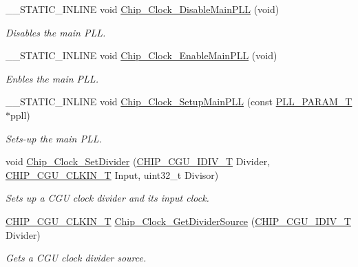 \begin{DoxyCompactItemize}
\+\_\+\+\_\+\+S\+T\+A\+T\+I\+C\+\_\+\+I\+N\+L\+I\+NE void \hyperlink{group___c_l_o_c_k__18_x_x__43_x_x_ga752e7a9c291cb61877d9f00a2c9772a3}{Chip\+\_\+\+Clock\+\_\+\+Disable\+Main\+P\+LL} (void)
\begin{DoxyCompactList}\small\item\em Disables the main P\+LL. \end{DoxyCompactList}\item 
\+\_\+\+\_\+\+S\+T\+A\+T\+I\+C\+\_\+\+I\+N\+L\+I\+NE void \hyperlink{group___c_l_o_c_k__18_x_x__43_x_x_gaf6a067bb264ab963d7f81eaa24ce9ec0}{Chip\+\_\+\+Clock\+\_\+\+Enable\+Main\+P\+LL} (void)
\begin{DoxyCompactList}\small\item\em Enbles the main P\+LL. \end{DoxyCompactList}\item 
\+\_\+\+\_\+\+S\+T\+A\+T\+I\+C\+\_\+\+I\+N\+L\+I\+NE void \hyperlink{group___c_l_o_c_k__18_x_x__43_x_x_ga227521c8f7cb4a3f3cff4b9b8c5364f0}{Chip\+\_\+\+Clock\+\_\+\+Setup\+Main\+P\+LL} (const \hyperlink{struct_p_l_l___p_a_r_a_m___t}{P\+L\+L\+\_\+\+P\+A\+R\+A\+M\+\_\+T} $\ast$ppll)
\begin{DoxyCompactList}\small\item\em Sets-\/up the main P\+LL. \end{DoxyCompactList}\item 
void \hyperlink{group___c_l_o_c_k__18_x_x__43_x_x_ga9df837b459e11fdf1eda8d48be292fc5}{Chip\+\_\+\+Clock\+\_\+\+Set\+Divider} (\hyperlink{chip__clocks_8h_a588e8716294cc2deec5d583add455521}{C\+H\+I\+P\+\_\+\+C\+G\+U\+\_\+\+I\+D\+I\+V\+\_\+T} Divider, \hyperlink{group___c_l_o_c_k__18_x_x__43_x_x_ga0975326707efebf2b074283e6c602f18}{C\+H\+I\+P\+\_\+\+C\+G\+U\+\_\+\+C\+L\+K\+I\+N\+\_\+T} Input, uint32\+\_\+t Divisor)
\begin{DoxyCompactList}\small\item\em Sets up a C\+GU clock divider and it\textquotesingle{}s input clock. \end{DoxyCompactList}\item 
\hyperlink{group___c_l_o_c_k__18_x_x__43_x_x_ga0975326707efebf2b074283e6c602f18}{C\+H\+I\+P\+\_\+\+C\+G\+U\+\_\+\+C\+L\+K\+I\+N\+\_\+T} \hyperlink{group___c_l_o_c_k__18_x_x__43_x_x_ga3fc4d71a69a9b0c44577264cd9491834}{Chip\+\_\+\+Clock\+\_\+\+Get\+Divider\+Source} (\hyperlink{chip__clocks_8h_a588e8716294cc2deec5d583add455521}{C\+H\+I\+P\+\_\+\+C\+G\+U\+\_\+\+I\+D\+I\+V\+\_\+T} Divider)
\begin{DoxyCompactList}\small\item\em Gets a C\+GU clock divider source. \end{DoxyCompactList}\item 

\end{DoxyCompactItemize}
